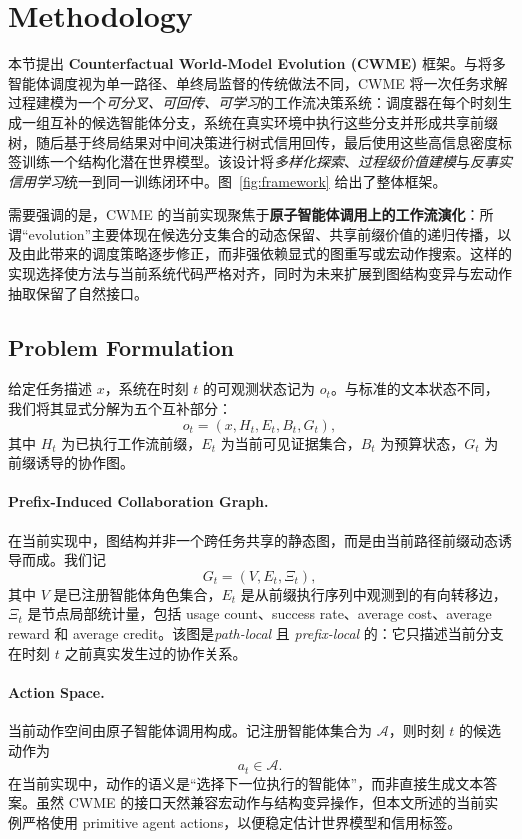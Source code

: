 \section{Methodology}

本节提出 \textbf{Counterfactual World-Model Evolution (CWME)} 框架。与将多智能体调度视为单一路径、单终局监督的传统做法不同，CWME 将一次任务求解过程建模为一个\emph{可分叉、可回传、可学习}的工作流决策系统：调度器在每个时刻生成一组互补的候选智能体分支，系统在真实环境中执行这些分支并形成共享前缀树，随后基于终局结果对中间决策进行树式信用回传，最后使用这些高信息密度标签训练一个结构化潜在世界模型。该设计将\emph{多样化探索}、\emph{过程级价值建模}与\emph{反事实信用学习}统一到同一训练闭环中。图~\ref{fig:framework} 给出了整体框架。

需要强调的是，CWME 的当前实现聚焦于\textbf{原子智能体调用上的工作流演化}：所谓“evolution”主要体现在候选分支集合的动态保留、共享前缀价值的递归传播，以及由此带来的调度策略逐步修正，而非强依赖显式的图重写或宏动作搜索。这样的实现选择使方法与当前系统代码严格对齐，同时为未来扩展到图结构变异与宏动作抽取保留了自然接口。

\subsection{Problem Formulation}

给定任务描述 $x$，系统在时刻 $t$ 的可观测状态记为 $o_t$。与标准的文本状态不同，我们将其显式分解为五个互补部分：
\begin{equation}
    o_t = \left(x, H_t, E_t, B_t, G_t\right),
\end{equation}
其中 $H_t$ 为已执行工作流前缀，$E_t$ 为当前可见证据集合，$B_t$ 为预算状态，$G_t$ 为前缀诱导的协作图。

\paragraph{Prefix-Induced Collaboration Graph.}
在当前实现中，图结构并非一个跨任务共享的静态图，而是由当前路径前缀动态诱导而成。我们记
\begin{equation}
    G_t = (V, E_t, \Xi_t),
\end{equation}
其中 $V$ 是已注册智能体角色集合，$E_t$ 是从前缀执行序列中观测到的有向转移边，$\Xi_t$ 是节点局部统计量，包括 usage count、success rate、average cost、average reward 和 average credit。该图是\emph{path-local} 且 \emph{prefix-local} 的：它只描述当前分支在时刻 $t$ 之前真实发生过的协作关系。

\paragraph{Action Space.}
当前动作空间由原子智能体调用构成。记注册智能体集合为 $\mathcal{A}$，则时刻 $t$ 的候选动作为
\begin{equation}
    a_t \in \mathcal{A}.
\end{equation}
在当前实现中，动作的语义是“选择下一位执行的智能体”，而非直接生成文本答案。虽然 CWME 的接口天然兼容宏动作与结构变异操作，但本文所述的当前实例严格使用 primitive agent actions，以便稳定估计世界模型和信用标签。

